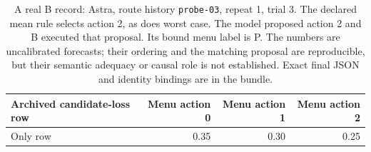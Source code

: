 \begin{table}[htbp]
\centering\small
\begin{tabular}{lrrr}\toprule
Archived candidate-loss row & Menu action 0 & Menu action 1 & Menu action 2\\\midrule
Only row & 0.35 & 0.30 & 0.25\\\bottomrule
\end{tabular}
\caption{A real B record: Astra, route history \texttt{probe-03}, repeat 1,
trial 3. The declared mean rule selects action 2, as does worst case.
The model proposed action 2 and B executed that proposal. Its bound menu label
is P. The numbers are uncalibrated forecasts; their ordering and the matching
proposal are reproducible, but their semantic adequacy or causal role is not
established. Exact final JSON and identity bindings are in the bundle.}
\label{tab:real-record}
\end{table}
